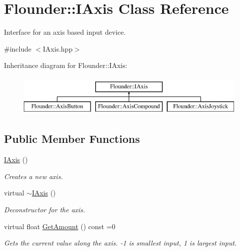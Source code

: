 \hypertarget{class_flounder_1_1_i_axis}{}\section{Flounder\+:\+:I\+Axis Class Reference}
\label{class_flounder_1_1_i_axis}


Interface for an axis based input device.  




{\ttfamily \#include $<$I\+Axis.\+hpp$>$}

Inheritance diagram for Flounder\+:\+:I\+Axis\+:\begin{figure}[H]
\begin{center}
\leavevmode
\includegraphics[height=2.000000cm]{class_flounder_1_1_i_axis}
\end{center}
\end{figure}
\subsection*{Public Member Functions}
\begin{DoxyCompactItemize}
\item 
\hyperlink{class_flounder_1_1_i_axis_a196f085ecce14ca34fd26edc81b3f00d}{I\+Axis} ()
\begin{DoxyCompactList}\small\item\em Creates a new axis. \end{DoxyCompactList}\item 
virtual \hyperlink{class_flounder_1_1_i_axis_aa52c7bd88edd157f9aab0b07282fbbcc}{$\sim$\+I\+Axis} ()
\begin{DoxyCompactList}\small\item\em Deconstructor for the axis. \end{DoxyCompactList}\item 
virtual float \hyperlink{class_flounder_1_1_i_axis_a5107db92879be3e2ea56841baea993b3}{Get\+Amount} () const =0
\begin{DoxyCompactList}\small\item\em Gets the current value along the axis. -\/1 is smallest input, 1 is largest input. \end{DoxyCompactList}\end{DoxyCompactItemize}


